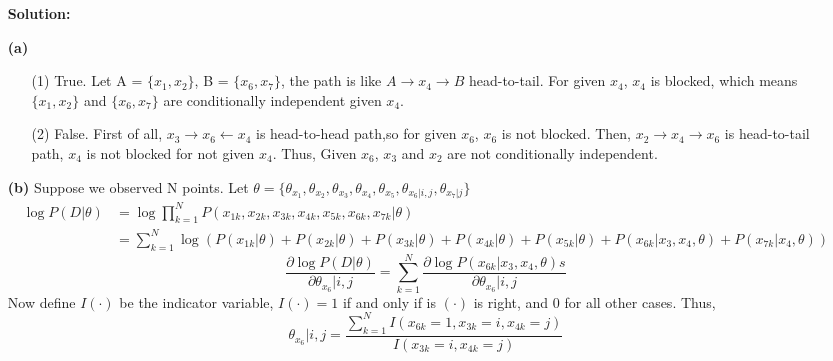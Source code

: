 \documentclass[10pt]{article}
\begin{document}
\begin{enumerate}
\textbf{Solution:}
    \item[\textbf{(a)}]
      \begin{enumerate}
        \item[{(1)}]True.
        Let A = $\{x_1,x_2 \}$, B = $\{x_6,x_7 \}$,
        the path is like $A\rightarrow x_4 \rightarrow B$ head-to-tail.
        For given $x_4$, $x_4$ is blocked, which means $ \{x_1, x_2\} $ and $ \{x_6, x_7\} $ are conditionally independent given $x_4$.
        \item[{(2)}] False. First of all, $x_3\rightarrow x_6 \leftarrow x_4$ is head-to-head path,so for given $x_6$, $x_6$ is not blocked.
        Then, $x_2 \rightarrow x_4 \rightarrow x_6$ is head-to-tail path, $x_4$ is not blocked for not given $x_4$.
        Thus, Given $x_6$, $ x_3 $ and $ x_2 $ are not conditionally independent.
      \end{enumerate}
    \item[\textbf{(b)}]
      Suppose we observed N points.
      Let $\theta = \{\theta_{x_1}, \theta_{x_2}, \theta_{x_3}, \theta_{x_4}, \theta_{x_5}, \theta_{x_6|i,j}, \theta_{x_7|j} \}$
      $$
      \begin{aligned}
          \log P(D|\theta) &= \log \prod_{k=1}^N P(x_{1k},x_{2k},x_{3k},x_{4k},x_{5k},x_{6k},x_{7k}|\theta)
          \\&= \sum_{k=1}^N \log  (P(x_{1k}|\theta)+ P(x_{2k}|\theta)+ P(x_{3k}|\theta)+ P(x_{4k}|\theta)+ 
          P(x_{5k}|\theta)+ P(x_{6k}|x_3,x_4,\theta)+ P(x_{7k}|x_4,\theta))
      \end{aligned}
      $$
      $$\frac{\partial \log P(D|\theta)}{\partial \theta_{x_6}|i,j} = \sum_{k=1}^N \frac{\partial \log P(x_{6k}|x_3,x_4,\theta)s}{\partial \theta_{x_6}|i,j}$$
      Now define $I(\cdot)$ be the indicator variable, $I(\cdot)=1$ if and only if is $(\cdot)$ is right, and 0 for all other cases.
      Thus,
      $$\theta_{x_6}|i,j = \frac{\sum_{k=1}^N I(x_{6k} = 1,x_{3k}=i,x_{4k}=j)}{I(x_{3k}=i,x_{4k}=j)}$$

    \end{enumerate}
\end{document}

